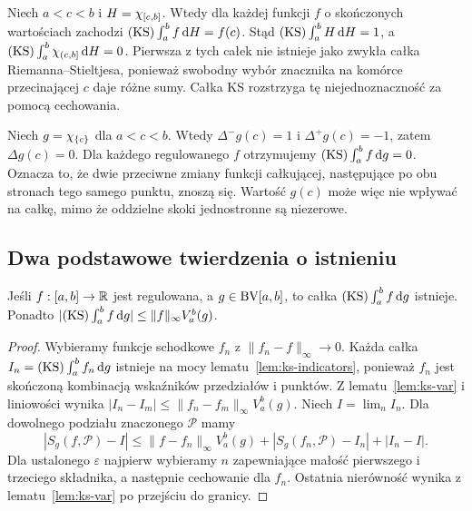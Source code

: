 \begin{przyklad}
Niech $a<c<b$ i $H=\chi_{[c,b]}$. Wtedy dla każdej funkcji $f$ o skończonych wartościach zachodzi $(\mathrm{KS})\int_a^b f\,\mathrm dH=f(c)$. Stąd $(\mathrm{KS})\int_a^b H\,\mathrm dH=1$, a $(\mathrm{KS})\int_a^b\chi_{(c,b]}\,\mathrm dH=0$. Pierwsza z tych całek nie istnieje jako zwykła całka Riemanna--Stieltjesa, ponieważ swobodny wybór znacznika na komórce przecinającej $c$ daje różne sumy. Całka KS rozstrzyga tę niejednoznaczność za pomocą cechowania.
\end{przyklad}

\begin{przyklad}
Niech $g=\chi_{\{c\}}$ dla $a<c<b$. Wtedy $\Delta^-g(c)=1$ i $\Delta^+g(c)=-1$, zatem $\Delta g(c)=0$. Dla każdego regulowanego $f$ otrzymujemy $(\mathrm{KS})\int_a^b f\,\mathrm dg=0$. Oznacza to, że dwie przeciwne zmiany funkcji całkującej, następujące po obu stronach tego samego punktu, znoszą się. Wartość $g(c)$ może więc nie wpływać na całkę, mimo że oddzielne skoki jednostronne są niezerowe.
\end{przyklad}

\subsection*{Dwa podstawowe twierdzenia o istnieniu}
\begin{twierdzenie}
\label{tw:ks-reg-bv}
Jeśli $f:[a,b]\to\mathbb R$ jest regulowana, a $g\in\mathrm{BV}[a,b]$, to całka $(\mathrm{KS})\int_a^b f\,\mathrm dg$ istnieje. Ponadto
$|(\mathrm{KS})\int_a^b f\,\mathrm dg|\le\|f\|_\infty V_a^b(g)$.
\end{twierdzenie}
\begin{proof}
Wybieramy funkcje schodkowe $f_n$ z $\|f_n-f\|_\infty\to0$. Każda całka $I_n=(\mathrm{KS})\int_a^b f_n\,\mathrm dg$ istnieje na mocy lematu~\ref{lem:ks-indicators}, ponieważ $f_n$ jest skończoną kombinacją wskaźników przedziałów i punktów. Z lematu~\ref{lem:ks-var} i liniowości wynika $|I_n-I_m|\le\|f_n-f_m\|_\infty V_a^b(g)$. Niech $I=\lim_n I_n$. Dla dowolnego podziału znaczonego $\mathcal P$ mamy
\[
 |S_g(f,\mathcal P)-I|\le
 \|f-f_n\|_\infty V_a^b(g)+|S_g(f_n,\mathcal P)-I_n|+|I_n-I|.
\]
Dla ustalonego $\varepsilon$ najpierw wybieramy $n$ zapewniające małość pierwszego i trzeciego składnika, a następnie cechowanie dla $f_n$. Ostatnia nierówność wynika z lematu~\ref{lem:ks-var} po przejściu do granicy.
\end{proof}

